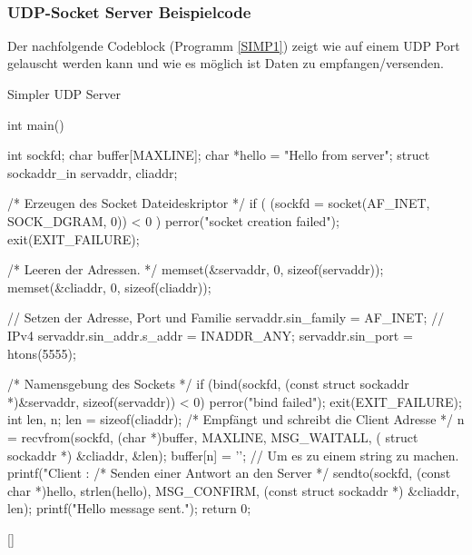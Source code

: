 \ \\%
\newpage
\subsubsection{UDP-Socket Server Beispielcode}
Der nachfolgende Codeblock (Programm \ref{SIMP1}) zeigt wie auf einem UDP Port gelauscht werden kann und wie es möglich ist Daten zu empfangen/versenden.
\begin{program}[H]
    \caption{Simpler UDP Server}
    \label{SIMP1}
    \begin{CppCode}
int main() {
    int sockfd;
    char buffer[MAXLINE];
    char *hello = "Hello from server";
    struct sockaddr_in servaddr, cliaddr;
    
    /* Erzeugen des Socket Dateideskriptor */
    if ( (sockfd = socket(AF_INET, SOCK_DGRAM, 0)) < 0 ) {
        perror("socket creation failed");
        exit(EXIT_FAILURE);
    }

    /* Leeren der Adressen. */
    memset(&servaddr, 0, sizeof(servaddr));
    memset(&cliaddr, 0, sizeof(cliaddr));

    // Setzen der Adresse, Port und Familie
    servaddr.sin_family = AF_INET; // IPv4
    servaddr.sin_addr.s_addr = INADDR_ANY;
    servaddr.sin_port = htons(5555); 

    /* Namensgebung des Sockets */
    if (bind(sockfd, (const struct sockaddr *)&servaddr, sizeof(servaddr)) < 0) {
        perror("bind failed");
        exit(EXIT_FAILURE);
    }
    int len, n;
    len = sizeof(cliaddr);
    /* Empfängt und schreibt die Client Adresse */
    n = recvfrom(sockfd, (char *)buffer, MAXLINE, MSG_WAITALL, ( struct sockaddr *) &cliaddr, &len);
    buffer[n] = '\0'; // Um es zu einem string zu machen.
    printf("Client : %
    /* Senden einer Antwort an den Server */
    sendto(sockfd, (const char *)hello, strlen(hello), MSG_CONFIRM, (const struct sockaddr *) &cliaddr, len);
    printf("Hello message sent.\n");
    return 0;
}
    \end{CppCode}[\cite{SRV14}]
\end{program}
\noindent
\newpage
